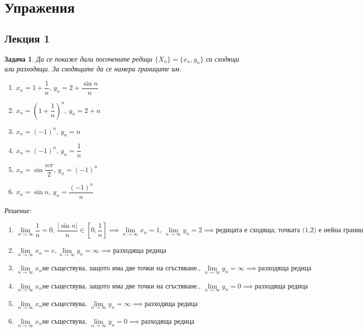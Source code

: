\documentclass[fleqn,12pt]{article}
\newtheorem{task}{Задача}[subsection]
\begin{document}
\section{Упражения}

\subsection{Лекция 1}

\begin{task}
Да се покаже дали посочените редици $\{ X_n \} = \{ x_n, y_n \}$ са сходящи или разходящи. За сходящите да се намери границите им.\\
\begin{enumerate}

\item $x_n = 1 + \dfrac{1}{n}, \, y_n = 2 + \dfrac{\sin{n}}{n}$
\item $x_n = \left( 1 + \dfrac{1}{n} \right) ^n, \, y_n = 2 + n $
\item $x_n = (-1)^n, \, y_n = n$
\item $x_n = (-1)^n, \, y_n = \dfrac{1}{n}$
\item $x_n =\sin{\dfrac{n \pi }{2}}, \, y_n = (-1)^n$
\item $x_n = \sin{n}, \, y_n = \dfrac{(-1)^n}{n}$

\end{enumerate}
Решение: \\
\begin{enumerate}

\item $\lim\limits_{n \to \infty} \dfrac{1}{n} = 0, \, \dfrac{\vert \sin{n} \vert}{n} \in \left[0, \dfrac{1}{n} \right] \implies 
\lim\limits_{n \to \infty} x_n = 1, \, \lim\limits_{n \to \infty} y_n = 2 \implies 
\text{редицата е сходяща; точката (1,2) е нейна граница}$

\item $ \lim\limits_{n \to \infty} x_n = e , \lim\limits_{n \to \infty} y_n = \infty \implies 
\text{разходяща редица} $

\item $ \lim\limits_{n \to \infty} x_n \text{не съществува, защото има две точки на сгъстяване.}, \,  
\lim\limits_{n \to \infty} y_n = \infty \implies \text{разходяща редица}$

\item $\lim\limits_{n \to \infty} x_n \text{не съществува, защото има две точки на сгъстяване.}, \,  
\lim\limits_{n \to \infty} y_n = 0 \implies \text{разходяща редица}$

\item $\lim\limits_{n \to \infty} x_n \text{не съществува}, \,  
\lim\limits_{n \to \infty} y_n = \infty \implies \text{разходяща редица}$

\item $\lim\limits_{n \to \infty} x_n \text{не съществува}, \,  
\lim\limits_{n \to \infty} y_n = 0 \implies \text{разходяща редица}$

\end{enumerate}

\end{task}
\end{document}
